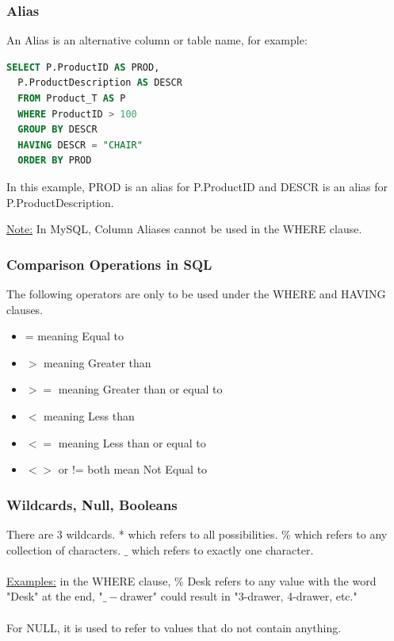 \documentclass[12pt]{article}
\begin{document}
\subsubsection{Alias}

An Alias is an alternative column or table name, for example:\\

\begin{lstlisting}[language=SQL]
SELECT P.ProductID AS PROD,
  P.ProductDescription AS DESCR
  FROM Product_T AS P
  WHERE ProductID > 100
  GROUP BY DESCR
  HAVING DESCR = "CHAIR"
  ORDER BY PROD

\end{lstlisting}

In this example, PROD is an alias for P.ProductID and DESCR is an alias for 
P.ProductDescription.

\begin{tcolorbox}
	\underline{Note:} In MySQL, Column Aliases cannot be used in the WHERE clause.
\end{tcolorbox}

\subsubsection{Comparison Operations in SQL}

The following operators are only to be used under the WHERE and HAVING clauses.

\begin{itemize}
	\item{= meaning Equal to}
	\item{$>$  meaning Greater than}
	\item{$>=$ meaning Greater than or equal to}
	\item{$<$  meaning Less than}
	\item{$<=$ meaning Less than or equal to}
	\item{$<>$ or != both mean Not Equal to}
\end{itemize}

\subsubsection{Wildcards, Null, Booleans}

There are 3 wildcards. * which refers to all possibilities. \% which refers to any collection of characters. $\_$ which refers to exactly one character.\\
\\
\underline{Examples:} in the WHERE clause, \% Desk refers to any value with the word "Desk" at the end, "$\_-$drawer" could result in "3-drawer, 4-drawer, etc."\\
\\
For NULL, it is used to refer to values that do not contain anything.
\end{document}
